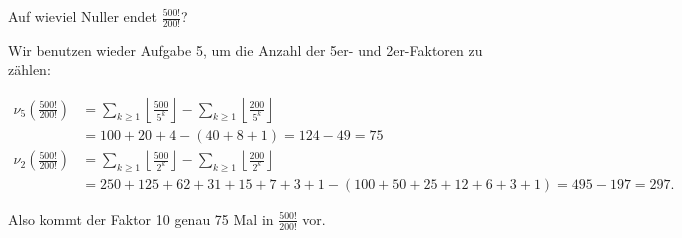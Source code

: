 
\begin{exercise}

Auf wieviel Nuller endet $\frac{500!}{200!}$?

\end{exercise}


\begin{solution}

Wir benutzen wieder Aufgabe 5, um die Anzahl der 5er- und 2er-Faktoren
zu zählen:

\begin{align*}
    \nu_5\left(\frac{500!}{200!}\right)
    &= \sum_{k\geq 1} \left\lfloor \frac{500}{5^k} \right\rfloor -
    \sum_{k\geq 1} \left\lfloor \frac{200}{5^k} \right\rfloor \\
    &= 100 + 20 + 4 - (40 + 8 + 1) = 124 - 49 = 75 \\
    \nu_2\left(\frac{500!}{200!}\right)
    &= \sum_{k\geq 1} \left\lfloor \frac{500}{2^k} \right\rfloor -
    \sum_{k\geq 1} \left\lfloor \frac{200}{2^k} \right\rfloor \\
    &= 250 + 125 + 62 + 31 + 15 + 7 + 3 + 1
    - (100 + 50 + 25 + 12 + 6 + 3 + 1)
    = 495 - 197 = 297.
\end{align*}

Also kommt der Faktor 10 genau 75 Mal in $\frac{500!}{200!}$ vor.

\end{solution}


